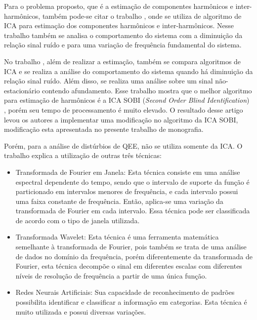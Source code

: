 \documentclass[a4paper,12pt]{monografia}
\theoremstyle{plain}
\theoremstyle{definition}
\theoremstyle{remark}
\begin{document}
Para o problema proposto, que é a estimação de componentes harmônicos e inter-harmônicos, também pode-se citar o trabalho \cite{he2015separation}, onde se utiliza  de algoritmo de ICA para estimação dos componentes harmônicos e inter-harmônicos. Nesse trabalho também se analisa o comportamento do sistema com a diminuição da relação sinal ruído e para uma variação de frequência fundamental do sistema.

No trabalho \cite{LimaComparacao}, além de realizar a estimação, também se compara algoritmos de ICA e se realiza a análise do comportamento do sistema quando há diminuição da relação sinal ruído. Além disso, se realiza uma análise sobre um sinal não-estacionário contendo afundamento. Esse trabalho mostra que o melhor algoritmo para estimação de harmônicos é a ICA SOBI (\textit{Second Order Blind Identification}) \cite{belouchrani1993second}, porém seu tempo de processamento é muito elevado. O resultado desse artigo levou os autores a implementar uma modificação no algoritmo da ICA SOBI, modificação esta apresentada no presente trabalho de monografia.

Porém, para a análise de distúrbios de QEE, não se utiliza somente da ICA. O trabalho \cite{oleskovicz2006estudo} explica a utilização de outras três técnicas:
 \begin{itemize}
   \item Transformada de Fourier em Janela: Esta técnica consiste em uma análise espectral dependente do tempo, sendo que o intervalo de suporte da função é particionado em intervalos menores de frequência, e cada intervalo possui uma faixa constante de frequência. Então, aplica-se uma variação da transformada de Fourier em cada intervalo. Essa técnica pode ser classificada de acordo com o tipo de janela utilizada.
   \item Transformada Wavelet: Esta técnica é uma ferramenta matemática semelhante à transformada de Fourier, pois também se trata de uma análise de dados no domínio da frequência, porém diferentemente da transformada de Fourier, esta técnica decompõe o sinal em diferentes escalas com diferentes níveis de resolução de frequência a partir de uma única função. 
   \item Redes Neurais Artificiais: Sua capacidade de reconhecimento de padrões possibilita identificar e classificar a informação em categorias. Esta técnica é muito utilizada e possui diversas variações.  
 \end{itemize}
 
\end{document}
